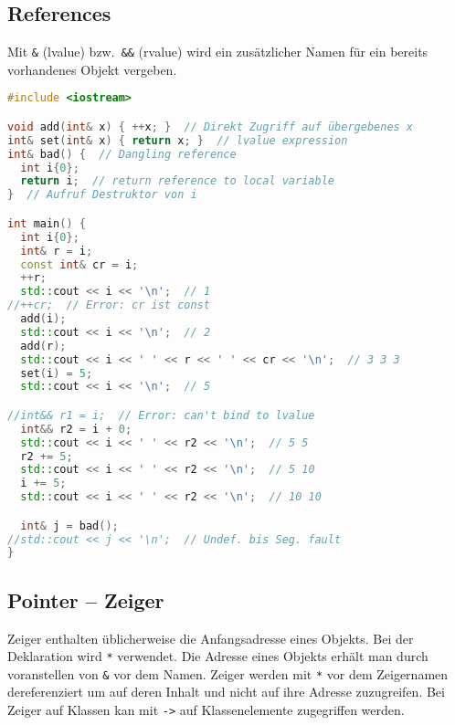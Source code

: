\documentclass[10pt,twocolumn]{scrartcl}
\begin{document}
\subsection{References}

Mit \lstinline|&| (lvalue) bzw.\ \lstinline|&&| (rvalue) wird ein zusätzlicher
Namen für ein bereits vorhandenes Objekt vergeben.

\begin{lstlisting}[language=C++]
#include <iostream>

void add(int& x) { ++x; }  // Direkt Zugriff auf übergebenes x
int& set(int& x) { return x; }  // lvalue expression
int& bad() {  // Dangling reference
  int i{0};
  return i;  // return reference to local variable
}  // Aufruf Destruktor von i

int main() {
  int i{0};
  int& r = i;
  const int& cr = i;
  ++r;
  std::cout << i << '\n';  // 1
//++cr;  // Error: cr ist const
  add(i);
  std::cout << i << '\n';  // 2
  add(r);
  std::cout << i << ' ' << r << ' ' << cr << '\n';  // 3 3 3
  set(i) = 5;
  std::cout << i << '\n';  // 5

//int&& r1 = i;  // Error: can't bind to lvalue
  int&& r2 = i + 0;
  std::cout << i << ' ' << r2 << '\n';  // 5 5
  r2 += 5;
  std::cout << i << ' ' << r2 << '\n';  // 5 10
  i += 5;
  std::cout << i << ' ' << r2 << '\n';  // 10 10

  int& j = bad();
//std::cout << j << '\n';  // Undef. bis Seg. fault
}
\end{lstlisting}

\subsection{Pointer -- Zeiger}

Zeiger enthalten üblicherweise die Anfangsadresse eines Objekts. Bei der
Deklaration wird \lstinline|*| verwendet. Die Adresse eines Objekts erhält man
durch voranstellen von \lstinline|&| vor dem Namen. Zeiger werden mit
\lstinline|*| vor dem Zeigernamen dereferenziert um auf deren Inhalt und nicht
auf ihre Adresse zuzugreifen. Bei Zeiger auf Klassen kan mit \lstinline|->| auf
Klassenelemente zugegriffen werden.
\end{document}
